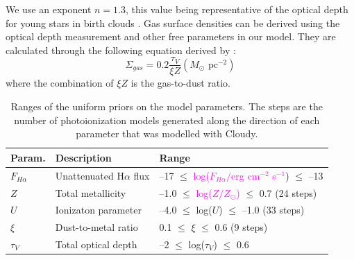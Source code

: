 \documentclass[fleqn,usenatbib]{mnras}
\begin{document}
We use an exponent $n = 1.3$, this value being representative of the optical depth for young stars in birth clouds \citep{dacunha2008}. Gas surface densities can be derived using the optical depth measurement and other free parameters in our model. They are calculated through the following equation derived by \cite{brinchmann2013}: 
\begin{equation}
    \label{eq:gas_equation_brinchmann}
    \Sigma_{gas} = 0.2 \frac{\tau_{V}}{\xi Z} (M_{\odot}\textrm{ pc}^{-2})
\end{equation}
where the combination of $\xi Z$ is the gas-to-dust ratio.
\begin{table}
 \centering
 \caption{Ranges of the uniform priors on the model parameters. The steps are the number of photoionization models generated along the direction of each parameter that was modelled with Cloudy.}
 \label{tab:model_priors}
\begin{tabularx}{\columnwidth}{lll}
\hline
\hline
\textbf{Param.} & \textbf{Description}            & \textbf{Range}                                \\ \hline
$F_{H\alpha}$      & Unattenuated H$\alpha$ flux     & --17 $\leq$ \textcolor{magenta}{log($F_{H\alpha}/$erg cm$^{-2}$ s$^{-1}$}) $\leq$ --13       \\
$Z$                & Total metallicity               & --1.0 $\leq$ \textcolor{magenta}{log($Z/Z_{\odot}$)} $\leq$ 0.7 (24 steps)   \\
$U$                & Ionizaton parameter             & --4.0 $\leq$ log($U$) $\leq$ --1.0 (33 steps) \\
$\xi$              & Dust-to-metal ratio             & 0.1 $\leq$ $\xi$ $\leq$ 0.6 (9 steps)         \\
$\tau_{V}$         & Total optical depth             & --2 $\leq$ log($\tau_{V}$) $\leq$ 0.6             \\
\hline
\end{tabularx}
\end{table}
\end{document}
